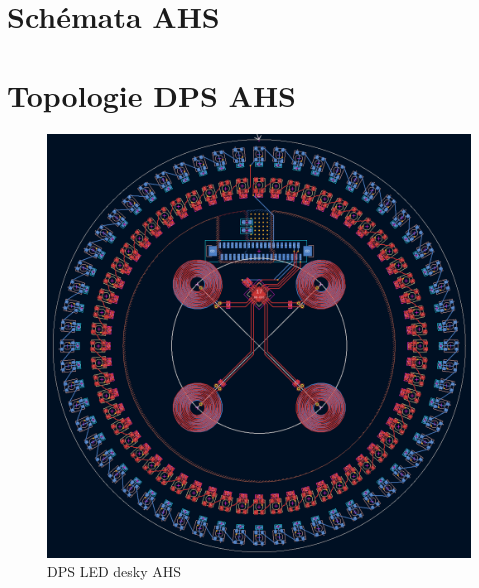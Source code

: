 \chapter{Schémata AHS}
\label{AHS-sch}


\chapter{Topologie DPS AHS}
\label{AHS-pcb}

\begin{figure}[!h]
	\begin{center}
		\includegraphics[width=\textwidth]{text/PraktickaCast/img/AHS-DPS-LEDDeska.png}
	\end{center}
	\caption{DPS LED desky AHS}
\end{figure}

